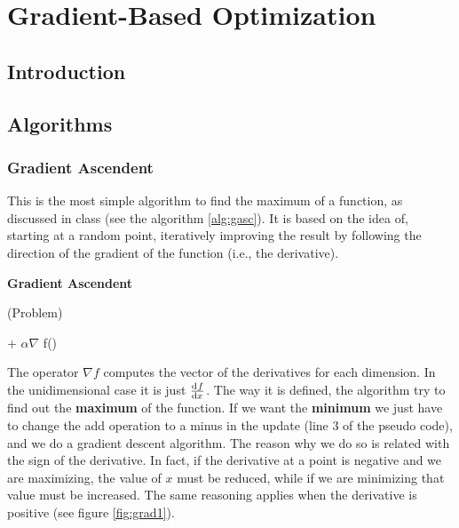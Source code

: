 \chapter{Gradient-Based Optimization}\label{cap:gradient}

\section{Introduction}

\section{Algorithms}

\subsection{Gradient Ascendent} 

This is the most simple algorithm to find the maximum of a function, as discussed in class (see the algorithm \ref{alg:gasc}). It is based on the idea of, starting at a random point,  iteratively improving the result by following the direction  of the gradient of the function (i.e., the derivative).

\begin{algorithm}

\caption{{\bf Gradient Ascendent\label{alg:gasc}}}
\BlankLine
{}
\BlankLine

 \Assign {}(Problem)

{ \Assign  {} +  $\alpha \nabla$ f()}



\end{algorithm}

The operator $\nabla f$ computes the vector of the derivatives for each dimension. In the unidimensional case it is just $\od{f}{x}$. The way it is defined, the algorithm try to find out the \textbf{maximum} of the function. If we want the \textbf{minimum} we just have to change the add operation to a minus in the update (line 3 of the pseudo code), and we do a gradient descent algorithm. The reason why we do so is related with the sign of the derivative. In fact, if the derivative at a point is negative and we are maximizing,  the value of $x$ must be reduced, while if we are minimizing that value must be increased. The same reasoning applies when the derivative is positive (see figure \ref{fig:grad1}). 

